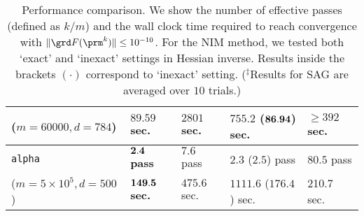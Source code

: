 \documentclass[smallextended]{svjour3}       %
\begin{document}
\begin{table}[h]
\begin{center}
{\begin{tabular}{l l l l l}
($m=60000, d = 784$) & $89.59$ sec. & $2801$ sec. & \cellcolor{asublue!7}\bfseries $755.2$ ($\bf 86.94$) sec. & $\geq 392$ sec.  %
\\
\hline
\texttt{alpha} & \cellcolor{asublue!7}\bfseries $\bf 2.4$ pass & $7.6$ pass & $2.3$ ($2.5$) pass & $80.5$ pass 
\\[-.05cm]
($m=5 \times 10^5, d = 500$) & \cellcolor{asublue!7}\bfseries $\bf 149.5$ sec. & $475.6$ sec. &  $1111.6$ ($176.4$) sec. & 210.7 sec. %
\\
\bottomrule
\end{tabular}}\vspace{-.2cm}
\end{center}
\caption{Performance comparison. 
We show the number of effective passes (defined as $k/m$) 
and the wall clock time required to reach convergence 
with $\| \grd F(\prm^k) \| \leq 10^{-10}$. For the {\sf NIM} method,
we tested both `exact' and `inexact' settings in Hessian 
inverse. Results inside the brackets $(\cdot)$ correspond
to `inexact' setting. ($^\ddagger$Results for {\sf SAG} are averaged 
over $10$ trials.)}\label{tab:real} \vspace{-.2cm}
\end{table}
\end{document}
